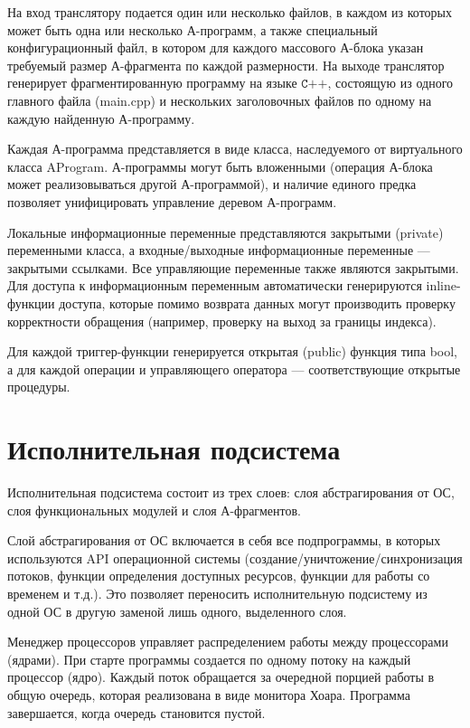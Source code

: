 \documentclass[a4paper,11pt]{article} %
\begin{document}
	
	\newpage
	На вход транслятору подается один или несколько файлов, в каждом из которых может
	быть одна или несколько А-программ, а также специальный конфигурационный файл, в котором
	для каждого массового А-блока указан требуемый размер А-фрагмента по каждой размерности.
	На выходе транслятор генерирует фрагментированную программу на языке $\texttt{C++}$, состоящую из
	одного главного файла (main.cpp) и нескольких заголовочных файлов по одному на каждую
	найденную А-программу.
	
	Каждая А-программа представляется в виде класса, наследуемого от виртуального класса
	AProgram. А-программы могут быть вложенными (операция А-блока может реализовываться
	другой А-программой), и наличие единого предка позволяет унифицировать управление деревом
	А-программ.
	
	Локальные информационные переменные представляются закрытыми (private) переменными
	класса, а входные/выходные информационные переменные --- закрытыми ссылками. Все управляющие переменные также являются закрытыми. Для доступа к информационным переменным
	автоматически генерируются inline-функции доступа, которые помимо возврата данных могут
	производить проверку корректности обращения (например, проверку на выход за границы индекса).
	
	Для каждой триггер-функции генерируется открытая (public) функция типа bool, а для каждой операции и управляющего оператора --- соответствующие открытые процедуры.
	
	\section{Исполнительная подсистема}
	Исполнительная подсистема состоит из трех слоев: слоя абстрагирования от ОС, слоя функциональных модулей и слоя А-фрагментов.
	
	Слой абстрагирования от ОС включается в себя все подпрограммы, в которых используются
	API операционной системы (создание/уничтожение/синхронизация потоков, функции определения доступных ресурсов, функции для работы со временем и т.д.). Это позволяет переносить
	исполнительную подсистему из одной ОС в другую заменой лишь одного, выделенного слоя.
	
	Менеджер процессоров управляет распределением работы между процессорами (ядрами).
	При старте программы создается по одному потоку на каждый процессор (ядро). Каждый поток
	обращается за очередной порцией работы в общую очередь, которая реализована в виде монитора
	Хоара. Программа завершается, когда очередь становится пустой.
	
\end{document}
